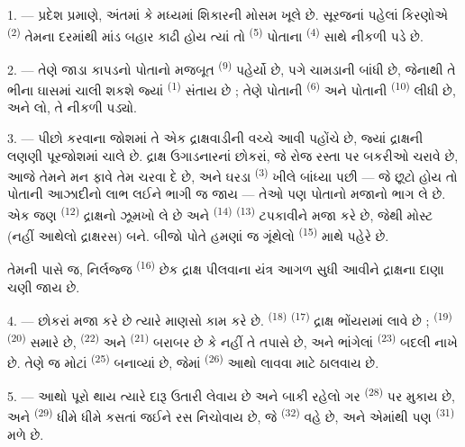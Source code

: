 1. --- પ્રદેશ પ્રમાણે,  અંતમાં કે 
મધ્યમાં શિકારની મોસમ ખૂલે છે. સૂરજનાં પહેલાં કિરણોએ 
\textsuperscript{(2)} તેમના દરમાંથી માંડ બહાર કાઢી હોય ત્યાં તો
 \textsuperscript{(5)} પોતાના 
\textsuperscript{(4)} સાથે નીકળી પડે છે.

2. --- તેણે જાડા કાપડનો પોતાનો મજબૂત 
\textsuperscript{(9)} પહેર્યો છે, પગે ચામડાની  બાંધી છે,
જેનાથી તે ભીના ઘાસમાં ચાલી શકશે જ્યાં 
\textsuperscript{(1)} સંતાય છે ; તેણે પોતાની 
\textsuperscript{(6)} અને પોતાની 
\textsuperscript{(10)} લીધી છે, અને લો, તે નીકળી પડ્યો.

3. --- પીછો કરવાના જોશમાં તે એક દ્રાક્ષવાડીની વચ્ચે આવી પહોંચે છે, જ્યાં
દ્રાક્ષની લણણી પૂરજોશમાં ચાલે છે. દ્રાક્ષ ઉગાડનારનાં છોકરાં, જે રોજ રસ્તા
પર બકરીઓ ચરાવે છે, આજે તેમને મન ફાવે તેમ ચરવા દે છે, અને ઘરડા
 \textsuperscript{(3)} ખીલે બાંધ્યા પછી — જે છૂટો હોય તો
પોતાની આઝાદીનો લાભ લઈને ભાગી જ જાય — તેઓ પણ પોતાનો મજાનો ભાગ લે છે. એક
જણ  \textsuperscript{(12)} દ્રાક્ષનો ઝૂમખો લે
છે અને  \textsuperscript{(14)} 
\textsuperscript{(13)} ટપકાવીને મજા કરે છે, જેથી મોસ્ટ (નહીં આથેલો
દ્રાક્ષરસ) બને. બીજો પોતે હમણાં જ ગૂંથેલો 
\textsuperscript{(15)} માથે પહેરે છે.

તેમની પાસે જ, નિર્લજ્જ  \textsuperscript{(16)} છેક દ્રાક્ષ
પીલવાના યંત્ર આગળ સુધી આવીને દ્રાક્ષના દાણા ચણી જાય છે.

4. --- છોકરાં મજા કરે છે ત્યારે માણસો કામ કરે છે.  \textsuperscript{(18)} 
\textsuperscript{(17)} દ્રાક્ષ ભોંયરામાં લાવે છે ;  \textsuperscript{(19)}  \textsuperscript{(20)}
સમારે છે,  \textsuperscript{(22)} અને
 \textsuperscript{(21)} બરાબર છે કે નહીં તે તપાસે છે, અને
ભાંગેલાં  \textsuperscript{(23)} બદલી નાખે છે. તેણે જ મોટાં
 \textsuperscript{(25)} બનાવ્યાં છે, જેમાં
 \textsuperscript{(26)} આથો લાવવા માટે ઠાલવાય છે.

5. --- આથો પૂરો થાય ત્યારે દારૂ ઉતારી લેવાય છે અને બાકી રહેલો ગર
 \textsuperscript{(28)} પર મુકાય છે, અને
 \textsuperscript{(29)} ધીમે ધીમે કસતાં જઈને રસ
નિચોવાય છે, જે  \textsuperscript{(32)} વહે છે,
અને એમાંથી પણ  \textsuperscript{(31)} મળે છે.

